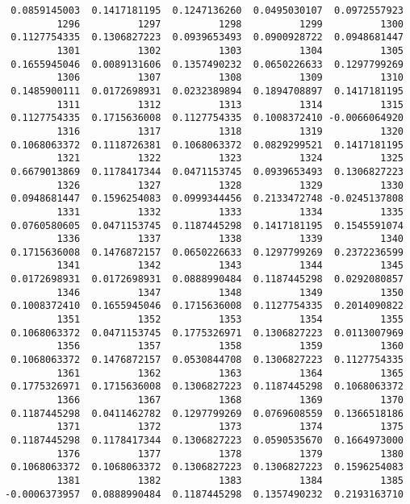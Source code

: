 \documentclass[
  letterpaper,
  DIV=11,
  numbers=noendperiod]{scrreprt}
\begin{document}
\begin{verbatim}
 0.0859145003  0.1417181195  0.1247136260  0.0495030107  0.0972557923 
         1296          1297          1298          1299          1300 
 0.1127754335  0.1306827223  0.0939653493  0.0900928722  0.0948681447 
         1301          1302          1303          1304          1305 
 0.1655945046  0.0089131606  0.1357490232  0.0650226633  0.1297799269 
         1306          1307          1308          1309          1310 
 0.1485900111  0.0172698931  0.0232389894  0.1894708897  0.1417181195 
         1311          1312          1313          1314          1315 
 0.1127754335  0.1715636008  0.1127754335  0.1008372410 -0.0066064920 
         1316          1317          1318          1319          1320 
 0.1068063372  0.1118726381  0.1068063372  0.0829299521  0.1417181195 
         1321          1322          1323          1324          1325 
 0.6679013869  0.1178417344  0.0471153745  0.0939653493  0.1306827223 
         1326          1327          1328          1329          1330 
 0.0948681447  0.1596254083  0.0999344456  0.2133472748 -0.0245137808 
         1331          1332          1333          1334          1335 
 0.0760580605  0.0471153745  0.1187445298  0.1417181195  0.1545591074 
         1336          1337          1338          1339          1340 
 0.1715636008  0.1476872157  0.0650226633  0.1297799269  0.2372236599 
         1341          1342          1343          1344          1345 
 0.0172698931  0.0172698931  0.0888990484  0.1187445298  0.0292080857 
         1346          1347          1348          1349          1350 
 0.1008372410  0.1655945046  0.1715636008  0.1127754335  0.2014090822 
         1351          1352          1353          1354          1355 
 0.1068063372  0.0471153745  0.1775326971  0.1306827223  0.0113007969 
         1356          1357          1358          1359          1360 
 0.1068063372  0.1476872157  0.0530844708  0.1306827223  0.1127754335 
         1361          1362          1363          1364          1365 
 0.1775326971  0.1715636008  0.1306827223  0.1187445298  0.1068063372 
         1366          1367          1368          1369          1370 
 0.1187445298  0.0411462782  0.1297799269  0.0769608559  0.1366518186 
         1371          1372          1373          1374          1375 
 0.1187445298  0.1178417344  0.1306827223  0.0590535670  0.1664973000 
         1376          1377          1378          1379          1380 
 0.1068063372  0.1068063372  0.1306827223  0.1306827223  0.1596254083 
         1381          1382          1383          1384          1385 
-0.0006373957  0.0888990484  0.1187445298  0.1357490232  0.2193163710 

\end{verbatim}
\end{document}

